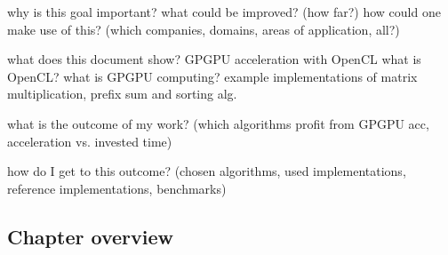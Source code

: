 why is this goal important?
what could be improved? (how far?)
how could one make use of this? (which companies, domains, areas of application, all?)


what does this document show?
GPGPU acceleration with OpenCL
what is OpenCL? what is GPGPU computing?
example implementations of matrix multiplication, prefix sum and sorting alg.

what is the outcome of my work? (which algorithms profit from GPGPU acc, acceleration vs. invested time)


how do I get to this outcome? (chosen algorithms, used implementations, reference implementations, benchmarks)

\subsection{Chapter overview}


